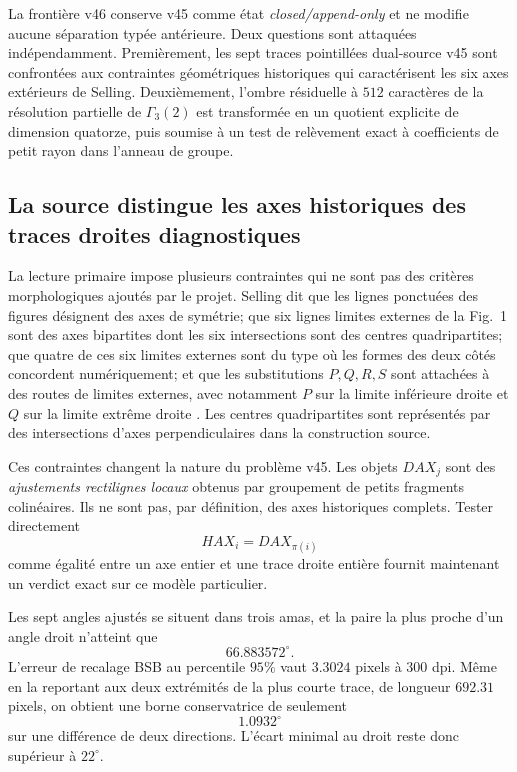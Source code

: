 \documentclass[11pt,a4paper]{article}
\begin{document}
La frontière v46 conserve v45 comme état \emph{closed/append-only} et ne modifie aucune séparation typée antérieure. Deux questions sont attaquées indépendamment. Premièrement, les sept traces pointillées dual-source v45 sont confrontées aux contraintes géométriques historiques qui caractérisent les six axes extérieurs de Selling. Deuxièmement, l'ombre résiduelle à $512$ caractères de la résolution partielle de $\Gamma_3(2)$ est transformée en un quotient explicite de dimension quatorze, puis soumise à un test de relèvement exact à coefficients de petit rayon dans l'anneau de groupe.

\subsection{La source distingue les axes historiques des traces droites diagnostiques}

La lecture primaire impose plusieurs contraintes qui ne sont pas des critères morphologiques ajoutés par le projet. Selling dit que les lignes ponctuées des figures désignent des axes de symétrie; que six lignes limites externes de la Fig.~1 sont des axes bipartites dont les six intersections sont des centres quadripartites; que quatre de ces six limites externes sont du type où les formes des deux côtés concordent numériquement; et que les substitutions $P,Q,R,S$ sont attachées à des routes de limites externes, avec notamment $P$ sur la limite inférieure droite et $Q$ sur la limite extrême droite \cite{Selling1877}. Les centres quadripartites sont représentés par des intersections d'axes perpendiculaires dans la construction source.

Ces contraintes changent la nature du problème v45. Les objets $DAX_j$ sont des \emph{ajustements rectilignes locaux} obtenus par groupement de petits fragments colinéaires. Ils ne sont pas, par définition, des axes historiques complets. Tester directement
\[
  HAX_i=DAX_{\pi(i)}
\]
comme égalité entre un axe entier et une trace droite entière fournit maintenant un verdict exact sur ce modèle particulier.

Les sept angles ajustés se situent dans trois amas, et la paire la plus proche d'un angle droit n'atteint que
\[
 \boxed{66.883572^\circ.}
\]
L'erreur de recalage BSB au percentile $95\%$ vaut $3.3024$ pixels à $300$ dpi. Même en la reportant aux deux extrémités de la plus courte trace, de longueur $692.31$ pixels, on obtient une borne conservatrice de seulement
\[
 \boxed{1.0932^\circ}
\]
sur une différence de deux directions. L'écart minimal au droit reste donc supérieur à $22^\circ$.
\end{document}
